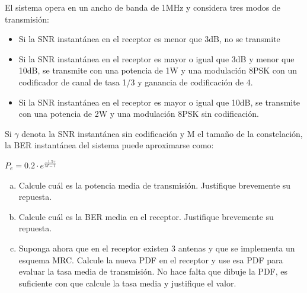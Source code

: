 \documentclass[fleqn,14pt]{article}
\begin{document}
El sistema opera en un ancho de banda de 1MHz y considera tres modos de transmisión:

\begin{itemize}
  \item Si la SNR instantánea en el receptor es menor que 3dB, no se transmite
  \item Si la SNR instantánea en el receptor es mayor o igual que 3dB y menor que 10dB, se transmite con una potencia de 1W y una modulación 8PSK con un codificador de canal de tasa 1/3 y ganancia de codificación de 4.
  \item Si la SNR instantánea en el receptor es mayor o igual que 10dB, se transmite con una potencia de 2W y una modulación 8PSK sin codificación.
\end{itemize}

Si $\gamma$ denota la SNR instantánea sin codificación y M el tamaño de la constelación, la BER instantánea del sistema puede aproximarse como:

\begin{center}
  $P_e = 0.2 \cdot e^{\frac{-1.5 \gamma}{M-1}}$
\end{center}

\begin{enumerate}[a)]
  \item Calcule cuál es la potencia media de transmisión. Justifique brevemente su repuesta.

  \item Calcule cuál es la BER media en el receptor. Justifique brevemente su repuesta.

  \item Suponga ahora que en el receptor existen 3 antenas y que se implementa un esquema MRC. Calcule la nueva PDF en el receptor y use esa PDF para evaluar la tasa media de transmisión. No hace falta que dibuje la PDF, es suficiente con que calcule la tasa media y justifique el valor.

\end{enumerate}
\end{document}
